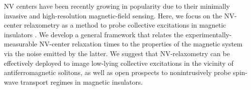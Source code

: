 NV centers have been recently growing in popularity due to their minimally invasive and high-resolution magnetic-field sensing. Here, we focus on the NV-center relaxometry as a method to probe collective excitations in magnetic insulators \cite{Du_2017}. We develop a general framework that relates the experimentally-measurable NV-center relaxation times to the properties of the magnetic system via the noise emitted by the latter. We suggest that NV-relaxometry can be effectively deployed to image low-lying collective excitations in the vicinity of antiferromagnetic solitons, as well as open prospects to nonintrusively probe spin-wave transport regimes in magnetic insulators.